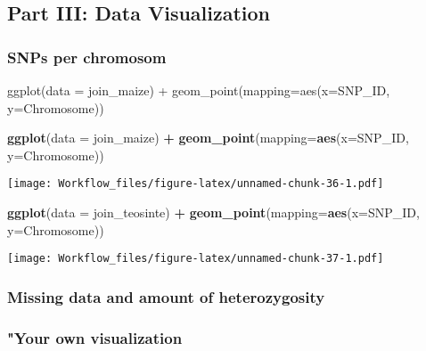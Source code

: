 \documentclass[]{article}
\newenvironment{Shaded}{\begin{snugshade}}{\end{snugshade}}
\newcommand{\DataTypeTok}[1]{\textcolor[rgb]{0.13,0.29,0.53}{#1}}
\newcommand{\KeywordTok}[1]{\textcolor[rgb]{0.13,0.29,0.53}{\textbf{#1}}}
\newcommand{\NormalTok}[1]{#1}
\newcommand{\OperatorTok}[1]{\textcolor[rgb]{0.81,0.36,0.00}{\textbf{#1}}}
\newcommand{\StringTok}[1]{\textcolor[rgb]{0.31,0.60,0.02}{#1}}
\begin{document}
\hypertarget{part-iii-data-visualization}{%
\subsection{Part III: Data
Visualization}\label{part-iii-data-visualization}}

\hypertarget{snps-per-chromosom}{%
\subsubsection{SNPs per chromosom}\label{snps-per-chromosom}}

ggplot(data = join\_maize) + geom\_point(mapping=aes(x=SNP\_ID,
y=Chromosome))

\begin{Shaded}
\begin{Highlighting}[]
\KeywordTok{ggplot}\NormalTok{(}\DataTypeTok{data =}\NormalTok{ join_maize) }\OperatorTok{+}\StringTok{ }\KeywordTok{geom_point}\NormalTok{(}\DataTypeTok{mapping=}\KeywordTok{aes}\NormalTok{(}\DataTypeTok{x=}\NormalTok{SNP_ID, }\DataTypeTok{y=}\NormalTok{Chromosome))}
\end{Highlighting}
\end{Shaded}

\texttt{[image: Workflow\_files/figure-latex/unnamed-chunk-36-1.pdf]}

\begin{Shaded}
\begin{Highlighting}[]
\KeywordTok{ggplot}\NormalTok{(}\DataTypeTok{data =}\NormalTok{ join_teosinte) }\OperatorTok{+}\StringTok{ }\KeywordTok{geom_point}\NormalTok{(}\DataTypeTok{mapping=}\KeywordTok{aes}\NormalTok{(}\DataTypeTok{x=}\NormalTok{SNP_ID, }\DataTypeTok{y=}\NormalTok{Chromosome))}
\end{Highlighting}
\end{Shaded}

\texttt{[image: Workflow\_files/figure-latex/unnamed-chunk-37-1.pdf]}

\hypertarget{missing-data-and-amount-of-heterozygosity}{%
\subsubsection{Missing data and amount of
heterozygosity}\label{missing-data-and-amount-of-heterozygosity}}

\hypertarget{your-own-visualization}{%
\subsubsection{"Your own visualization}\label{your-own-visualization}}
\end{document}
